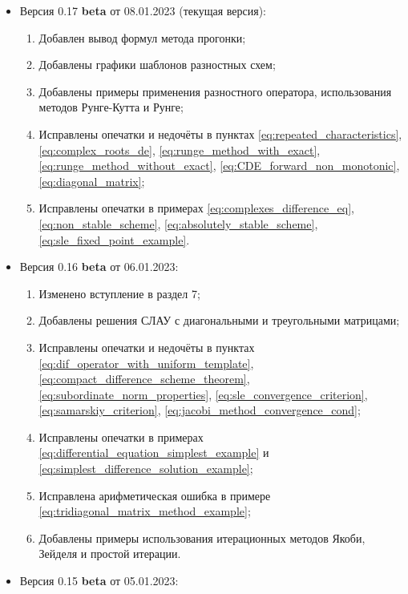 \documentclass{article}
\begin{document}

\begin{itemize}[nosep]
\item Версия 0.17 \textbf{beta} от 08.01.2023 (текущая версия):
	\begin{enumerate}[nosep]
		\item Добавлен вывод формул метода прогонки;
		\item Добавлены графики шаблонов разностных схем;
		\item Добавлены примеры применения разностного оператора,
			использования методов Рунге-Кутта и Рунге;
		\item Исправлены опечатки и недочёты в пунктах
			\eqref{eq:repeated_characteristics},
			\eqref{eq:complex_roots_de},
			\eqref{eq:runge_method_with_exact},
			\eqref{eq:runge_method_without_exact},
			\eqref{eq:CDE_forward_non_monotonic},
			\eqref{eq:diagonal_matrix};
		\item Исправлены опечатки в примерах
			\eqref{eq:complexes_difference_eq},
			\eqref{eq:non_stable_scheme},
			\eqref{eq:absolutely_stable_scheme},
			\eqref{eq:sle_fixed_point_example}.
	\end{enumerate}
\item Версия 0.16 \textbf{beta} от 06.01.2023:
	\begin{enumerate}[nosep]
		\item Изменено вступление в раздел 7;
		\item Добавлены решения СЛАУ с диагональными и треугольными
			матрицами;
		\item Исправлены опечатки и недочёты в пунктах
			\eqref{eq:dif_operator_with_uniform_template},
			\eqref{eq:compact_difference_scheme_theorem},
			\eqref{eq:subordinate_norm_properties},
			\eqref{eq:sle_convergence_criterion},
			\eqref{eq:samarskiy_criterion},
			\eqref{eq:jacobi_method_convergence_cond};
		\item Исправлены опечатки в примерах
			\eqref{eq:differential_equation_simplest_example} и
			\eqref{eq:simplest_difference_solution_example};
		\item Исправлена арифметическая ошибка в примере
			\eqref{eq:tridiagonal_matrix_method_example};
		\item Добавлены примеры использования итерационных методов
			Якоби, Зейделя и простой итерации.
	\end{enumerate}
\item Версия 0.15 \textbf{beta} от 05.01.2023:
	\begin{enumerate}[nosep]

\end{enumerate}
\end{itemize}
\end{document}

